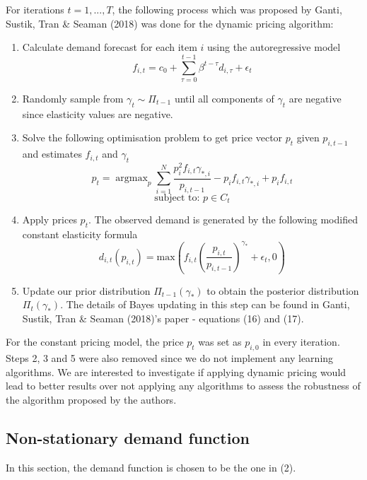 \documentclass[a4paper]{article}
\DeclareMathOperator*{\argmax}{argmax}
\begin{document}
\newline
\newline
For iterations $t = 1,...,T$, the following process which was proposed by Ganti, Sustik, Tran \& Seaman (2018) was done for the dynamic pricing algorithm:
\begin{enumerate}
	\item Calculate demand forecast for each item $i$ using the autoregressive model \[ f_{i,t} = c_0 + \sum_{\tau=0}^{t-1} \beta^{t-\tau}d_{i,\tau} + \epsilon_t \]
	\item Randomly sample from $\gamma_t \sim \Pi_{t-1}$ until all components of $\gamma_t$ are negative since elasticity values are negative.
	\item Solve the following optimisation problem to get price vector $p_t$ given $p_{i,t-1}$ and estimates $f_{i,t}$ and $\gamma_t$ \[p_t = \argmax_p \sum_{i=1}^{N}\frac{p_i^2f_{i,t}\gamma_{*,i}}{p_{i,t-1}} -p_if_{i,t}\gamma_{*,i} + p_if_{i,t}\] \[\text{subject to: } p \in C_t \]
	\item Apply prices $p_t$. The observed demand is generated by the following modified constant elasticity formula \[ d_{i,t}(p_{i,t}) = \text{max} \left(f_{i,t}\left(\frac{p_{i,t}}{p_{i,t-1}}\right)^{\gamma_*} + \epsilon_t, 0 \right) \] 
	\item Update our prior distribution $\Pi_{t-1}(\gamma_*)$ to obtain the posterior distribution $\Pi_t(\gamma_*)$. The details of Bayes updating in this step can be found in  Ganti, Sustik, Tran \& Seaman (2018)'s paper - equations (16) and (17).
\end{enumerate}
For the constant pricing model, the price $p_t$ was set as $p_{i,0}$ in every iteration. Steps 2, 3 and 5 were also removed since we do not implement any learning algorithms. We are interested to investigate if applying dynamic pricing would lead to better results over not applying any algorithms to assess the robustness of the algorithm proposed by the authors.
\subsection{Non-stationary demand function}
In this section, the demand function is chosen to be the one in (2).
\end{document}

